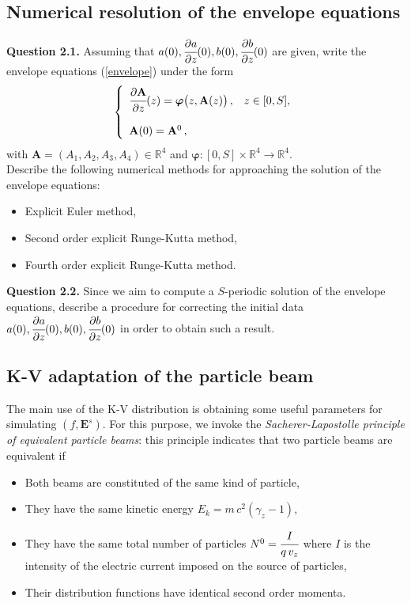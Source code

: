 \documentclass[10pt]{article}
\newcommand{\R}{{\mathbb R}}
\newcommand{\D}{{\partial}}
\begin{document}
\subsection{Numerical resolution of the envelope equations}


\begin{leftbar}
\textbf{Question 2.1.} Assuming that $a(0),\cfrac{\D a}{\D z}(0),b(0),\cfrac{\D b}{\D z}(0)$ are given, write the envelope equations (\ref{envelope}) under the form
\begin{equation}
\left\{
\begin{array}{ll}
\cfrac{\D \mathbf{A}}{\D z}(z) = \bm{\varphi}\big(z,\mathbf{A}(z)\big) \, , & \textnormal{$z \in [0,S]$,} \\ \\
\mathbf{A}(0) = \mathbf{A}^{0} \, ,
\end{array}
\right.
\end{equation}
with $\mathbf{A} = (A_{1},A_{2},A_{3},A_{4}) \in \R^{4}$ and $\bm{\varphi} : [0,S] \times \R^{4} \to \R^{4}$. \\
Describe the following numerical methods for approaching the solution of the envelope equations:
\begin{itemize}
\item Explicit Euler method,
\item Second order explicit Runge-Kutta method,
\item Fourth order explicit Runge-Kutta method.
\end{itemize}
\end{leftbar}


\begin{leftbar}
\textbf{Question 2.2.} Since we aim to compute a $S$-periodic solution of the envelope equations, describe a procedure for correcting the initial data $a(0),\cfrac{\D a}{\D z}(0),b(0),\cfrac{\D b}{\D z}(0)$ in order to obtain such a result.
\end{leftbar}




\subsection{K-V adaptation of the particle beam}

The main use of the K-V distribution is obtaining some useful parameters for simulating $(f,\mathbf{E}^{s})$. For this purpose, we invoke the \textit{Sacherer-Lapostolle principle of equivalent particle beams}: this principle indicates that two particle beams are equivalent if
\begin{itemize}
\item Both beams are constituted of the same kind of particle,
\item They have the same kinetic energy $E_{k} = m\,c^{2}(\gamma_{z}-1)$,
\item They have the same total number of particles $N^{0} = \cfrac{I}{q\,v_{z}}$ where $I$ is the intensity of the electric current imposed on the source of particles,
\item Their distribution functions have identical second order momenta.
\end{itemize}
\end{document}
